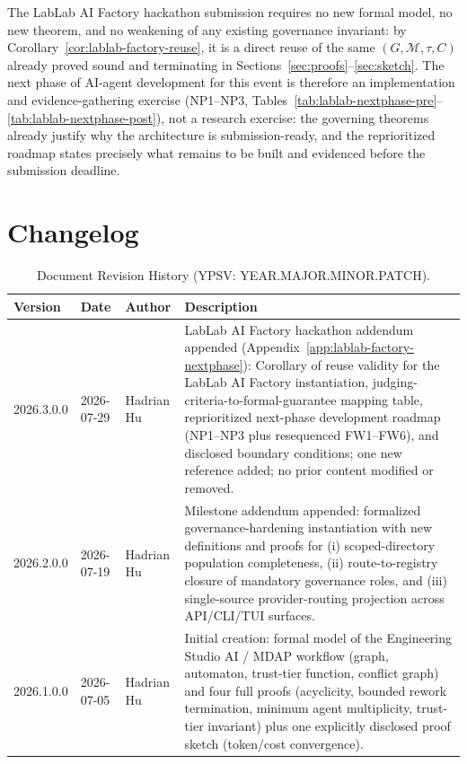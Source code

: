 \documentclass[12pt]{article}
\theoremstyle{definition}
\begin{document}
The LabLab AI Factory hackathon submission requires no new formal
model, no new theorem, and no weakening of any existing governance
invariant: by Corollary~\ref{cor:lablab-factory-reuse}, it is a direct
reuse of the same $(G, \mathcal{M}, \tau, C)$ already proved sound and
terminating in Sections~\ref{sec:proofs}--\ref{sec:sketch}.  The next
phase of AI-agent development for this event is therefore an
implementation and evidence-gathering exercise (NP1--NP3,
Tables~\ref{tab:lablab-nextphase-pre}--\ref{tab:lablab-nextphase-post}),
not a research exercise: the
governing theorems already justify why the architecture is submission-ready,
and the reprioritized roadmap states precisely what remains to be built
and evidenced before the submission deadline.



\newpage
\section*{Changelog}
\label{sec:changelog}

\begin{table}[H]
\centering
\caption{Document Revision History (YPSV: YEAR.MAJOR.MINOR.PATCH).}
\begin{tabular}{@{}lllp{6.5cm}@{}}
\toprule
\textbf{Version} & \textbf{Date} & \textbf{Author} & \textbf{Description} \\
\midrule
2026.3.0.0 & 2026-07-29 & Hadrian Hu & LabLab AI Factory hackathon
addendum appended (Appendix~\ref{app:lablab-factory-nextphase}):
Corollary of reuse validity for the LabLab AI Factory instantiation,
judging-criteria-to-formal-guarantee mapping table, reprioritized
next-phase development roadmap (NP1--NP3 plus resequenced FW1--FW6),
and disclosed boundary conditions; one new reference added; no prior
content modified or removed. \\
2026.2.0.0 & 2026-07-19 & Hadrian Hu & Milestone addendum appended:
formalized governance-hardening instantiation with new definitions and
proofs for (i) scoped-directory population completeness, (ii)
route-to-registry closure of mandatory governance roles, and (iii)
single-source provider-routing projection across API/CLI/TUI surfaces. \\
2026.1.0.0 & 2026-07-05 & Hadrian Hu & Initial creation: formal model of the
Engineering Studio AI / MDAP workflow (graph, automaton, trust-tier
function, conflict graph) and four full proofs (acyclicity, bounded
rework termination, minimum agent multiplicity, trust-tier invariant) plus
one explicitly disclosed proof sketch (token/cost convergence). \\
\bottomrule
\end{tabular}
\end{table}
\end{document}
